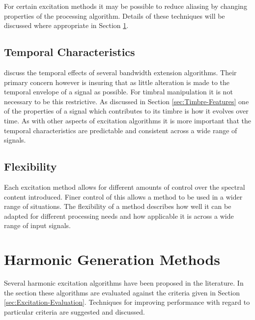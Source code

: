 			For certain excitation methods it may be possible to reduce aliasing by changing properties of the
			processing algorithm. Details of these techniques will be discussed where appropriate in Section
			\ref{sec:Excitation-Methods}.

	\subsection{Temporal Characteristics}
	\label{sec:Excitation-Evaluation-TemporalCharacteristics}
		\citep{larsen2004audio} discuss the temporal effects of several bandwidth extension algorithms. Their
		primary concern however is insuring that as little alteration is made to the temporal envelope of a signal
		as possible. For timbral manipulation it is not necessary to be this restrictive. As discussed in Section
		\ref{sec:Timbre-Features} one of the properties of a signal which contributes to its timbre is how it
		evolves over time. As with other aspects of excitation algorithms it is more important that the temporal
		characteristics are predictable and consistent across a wide range of signals.

	\subsection{Flexibility}
	\label{sec:Excitation-Evaluation-Flexibility}
		Each excitation method allows for different amounts of control over the spectral content introduced. Finer
		control of this allows a method to be used in a wider range of situations. The flexibility of a method
		describes how well it can be adapted for different processing needs and how applicable it is across a wide
		range of input signals.


\section{Harmonic Generation Methods}
\label{sec:Excitation-Methods}
	Several harmonic excitation algorithms have been proposed in the literature. In the section these algorithms are
	evaluated against the criteria given in Section \ref{sec:Excitation-Evaluation}. Techniques for improving
	performance with regard to particular criteria are suggested and discussed. 

